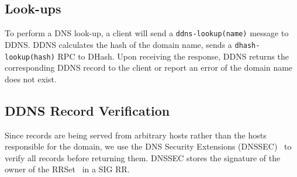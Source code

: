\subsection{Look-ups}

To perform a DNS look-up, a client will send a 
{\tt ddns-lookup(name)} message to {DDNS}.
DDNS 
calculates the hash of the domain name, sends a
{\tt dhash-lookup(hash)} RPC to DHash. Upon receiving
the response, DDNS returns the corresponding DDNS record to the 
client or report an error of the domain name does 
not exist.

\subsection{DDNS Record Verification}

Since records are being served from arbitrary hosts rather
than the hosts responsible for the domain, 
we use the DNS Security Extensions (DNSSEC)~\cite{dnssec-rfc} to
verify all records before returning them. DNSSEC stores the 
signature of the owner of the RRSet~\cite{dnscla-rfc} in a 
SIG RR.
